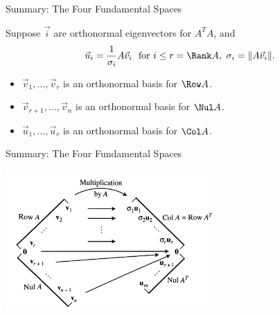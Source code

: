 \begin{frame}{Summary: The Four Fundamental Spaces}

    Suppose $\vec i$ are orthonormal eigenvectors for $A^TA$, and $$\vec u _i = \frac{1}{\sigma_i}A\vec v_ i \ \text{ for } i \le r = \Rank A, \ \sigma_i = \lVert A \vec v_i \rVert.$$ 
    \begin{itemize}
    
        \item<3->  $ \vec v_1 ,\dotsc, \vec v_r$ is an orthonormal basis for $ \Row A$. 
        
        \item<4->  $ \vec v_{r+1} ,\dotsc, \vec v_n$ is an orthonormal basis for $ \Nul  A $. 
        
        \item<5->  $ \vec u_1 ,\dotsc, \vec u_r$ is an orthonormal basis for $ \Col A$.  
        
        
    \end{itemize}

    \vspace{12pt} 
    
     
    
\end{frame}


\begin{frame}{Summary: The Four Fundamental Spaces}

\begin{center}
\includegraphics[width=0.6\textwidth]{Chapter7/images/image005.jpg} 
\end{center}


\end{frame}



